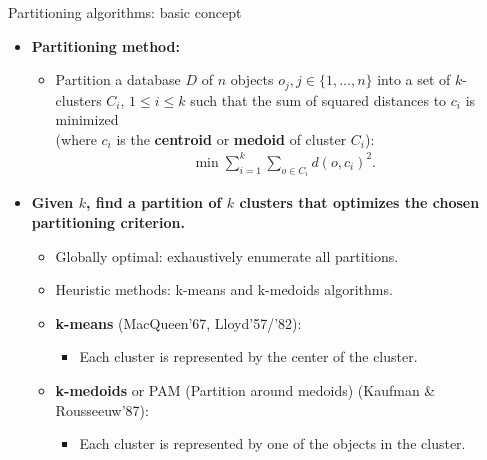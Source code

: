 \documentclass[aspectratio=169,t,xcolor=dvipsnames]{beamer}
\begin{document}
  {
    \begin{frame}{Partitioning algorithms: basic concept}
        \begin{itemize}
          \item \textbf{Partitioning method:}
          \begin{itemize}
            \item Partition a database $D$ of $n$ objects $o_j, j \in \{1, \ldots, n\}$ into a set of $k$-clusters $C_i$, $1 \leq i \leq k$ such that the sum of squared distances to $c_i$ is minimized \\ (where $c_i$ is the \textbf{\color{airforceblue}centroid} or \textbf{\color{airforceblue}medoid} of cluster $C_i$):
            \begin{align}
              \min \sum_{i=1}^{k} \sum_{o \in C_i} d(o,c_i)^2.
            \end{align}
          \end{itemize}
          \item \textbf{Given $k$, find a partition of $k$ clusters that optimizes the chosen partitioning criterion.}
          \begin{itemize}
            \item Globally optimal: exhaustively enumerate all partitions.
            \item Heuristic methods: k-means and k-medoids algorithms.
            \item \textbf{\color{airforceblue}k-means} (MacQueen'67, Lloyd'57/'82):
            \begin{itemize}
              \item Each cluster is represented by the center of the cluster.
            \end{itemize}
            \item \textbf{\color{airforceblue}k-medoids} or PAM (Partition around medoids) (Kaufman \& Rousseeuw'87):
            \begin{itemize}
              \item Each cluster is represented by one of the objects in the cluster.
            \end{itemize}
          \end{itemize}
        \end{itemize}
    \end{frame}
  }
\end{document}
